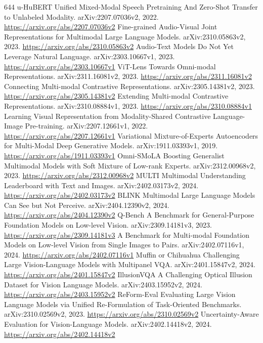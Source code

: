 \documentclass[11pt]{article}
\begin{document}
\begin{thebibliography}{644}
 u-HuBERT Unified Mixed-Modal Speech Pretraining And Zero-Shot Transfer to Unlabeled Modality. arXiv:2207.07036v2, 2022. \url{https://arxiv.org/abs/2207.07036v2}
 Fine-grained Audio-Visual Joint Representations for Multimodal Large Language Models. arXiv:2310.05863v2, 2023. \url{https://arxiv.org/abs/2310.05863v2}
 Audio-Text Models Do Not Yet Leverage Natural Language. arXiv:2303.10667v1, 2023. \url{https://arxiv.org/abs/2303.10667v1}
 ViT-Lens Towards Omni-modal Representations. arXiv:2311.16081v2, 2023. \url{https://arxiv.org/abs/2311.16081v2}
 Connecting Multi-modal Contrastive Representations. arXiv:2305.14381v2, 2023. \url{https://arxiv.org/abs/2305.14381v2}
 Extending Multi-modal Contrastive Representations. arXiv:2310.08884v1, 2023. \url{https://arxiv.org/abs/2310.08884v1}
 Learning Visual Representation from Modality-Shared Contrastive Language-Image Pre-training. arXiv:2207.12661v1, 2022. \url{https://arxiv.org/abs/2207.12661v1}
 Variational Mixture-of-Experts Autoencoders for Multi-Modal Deep Generative Models. arXiv:1911.03393v1, 2019. \url{https://arxiv.org/abs/1911.03393v1}
 Omni-SMoLA Boosting Generalist Multimodal Models with Soft Mixture of Low-rank Experts. arXiv:2312.00968v2, 2023. \url{https://arxiv.org/abs/2312.00968v2}
 MULTI Multimodal Understanding Leaderboard with Text and Images. arXiv:2402.03173v2, 2024. \url{https://arxiv.org/abs/2402.03173v2}
 BLINK Multimodal Large Language Models Can See but Not Perceive. arXiv:2404.12390v2, 2024. \url{https://arxiv.org/abs/2404.12390v2}
 Q-Bench A Benchmark for General-Purpose Foundation Models on Low-level Vision. arXiv:2309.14181v3, 2023. \url{https://arxiv.org/abs/2309.14181v3}
 A Benchmark for Multi-modal Foundation Models on Low-level Vision from Single Images to Pairs. arXiv:2402.07116v1, 2024. \url{https://arxiv.org/abs/2402.07116v1}
 Muffin or Chihuahua Challenging Large Vision-Language Models with Multipanel VQA. arXiv:2401.15847v2, 2024. \url{https://arxiv.org/abs/2401.15847v2}
 IllusionVQA A Challenging Optical Illusion Dataset for Vision Language Models. arXiv:2403.15952v2, 2024. \url{https://arxiv.org/abs/2403.15952v2}
 ReForm-Eval Evaluating Large Vision Language Models via Unified Re-Formulation of Task-Oriented Benchmarks. arXiv:2310.02569v2, 2023. \url{https://arxiv.org/abs/2310.02569v2}
 Uncertainty-Aware Evaluation for Vision-Language Models. arXiv:2402.14418v2, 2024. \url{https://arxiv.org/abs/2402.14418v2}

\end{thebibliography}
\end{document}
